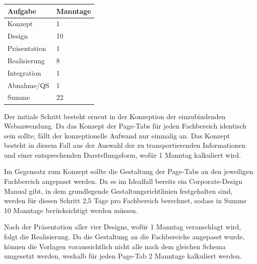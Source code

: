 \documentclass[a4paper]{article}
\begin{document}
\bigskip

\begin{center}
\tablefirsthead{}
\tablehead{}
\tabletail{}
\tablelasttail{}
\begin{supertabular}{|m{2.744cm}|m{2.247cm}|}
\hline
{\sffamily\bfseries\color{black} Aufgabe} &
{\sffamily\bfseries\color{black} Manntage}\\\hline
{\sffamily\color{black} Konzept} &
{\sffamily\color{black} 1 }\\\hline
{\sffamily\color{black} Design} &
{\sffamily\color{black} 10 }\\\hline
{\sffamily\color{black} Präsentation} &
{\sffamily\color{black} 1 }\\\hline
{\sffamily\color{black} Realisierung} &
{\sffamily\color{black} 8 }\\\hline
{\sffamily\color{black} Integration} &
{\sffamily\color{black} 1}\\\hline
{\sffamily\color{black} Abnahme/QS} &
{\sffamily\color{black} 1}\\\hline
{\sffamily\color{black} Summe} &
{\sffamily\color{black} 22 }\\\hline
\end{supertabular}
\end{center}

\bigskip

{\sffamily
Der initiale Schritt besteht erneut in der Konzeption der einzubindenden Webanwendung. Da das Konzept der Page-Tabs für
jeden Fachbereich identisch sein sollte, fällt der konzeptionelle Aufwand nur einmalig an. Das Konzept besteht in
diesem Fall aus der Auswahl der zu transportierenden Informationen und einer entsprechenden Darstellungsform, wofür 1
Manntag kalkuliert wird.}


\bigskip

{\sffamily
Im Gegensatz zum Konzept sollte die Gestaltung der Page-Tabs an den jeweiligen Fachbereich angepasst werden. Da es im
Idealfall bereits ein Corporate-Design Manual gibt, in dem grundlegende Gestaltungsrichtlinien festgehalten sind,
werden für diesen Schritt 2,5 Tage pro Fachbereich berechnet, sodass in Summe 10 Manntage berücksichtigt werden
müssen.}


\bigskip

{\sffamily
Nach der Präsentation aller vier Designs, wofür 1 Manntag veranschlagt wird, folgt die Realisierung. Da die Gestaltung
an die Fachbereiche angepasst wurde, können die Vorlagen voraussichtlich nicht alle nach dem gleichen Schema umgesetzt
werden, weshalb für jeden Page-Tab 2 Manntage kalkuliert werden.}
\end{document}
